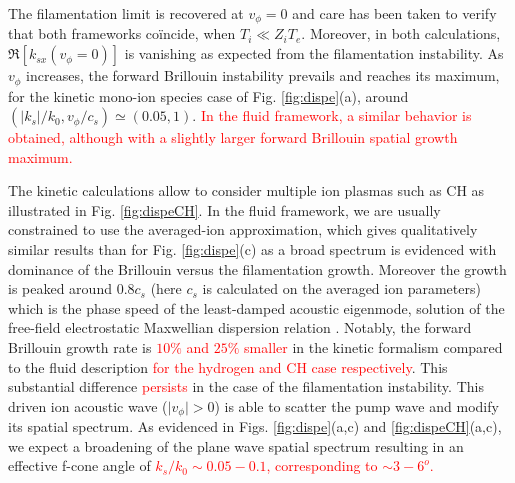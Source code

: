 \documentclass[
 reprint,
 superscriptaddress,
 amsmath,amssymb,
 aps,
]{revtex4-1}
\def\tc{\textcolor{red}}
\begin{document}
The filamentation limit is recovered at $v_\phi=0$ and care has been taken to verify that both frameworks co\"incide, when $T_i\ll Z_iT_e$. Moreover, in both calculations, $\Re[k_{sx}(v_\phi=0)]$ is vanishing as expected from the filamentation instability. As $v_\phi$ increases, the forward Brillouin instability prevails and reaches its maximum, for the kinetic  mono-ion species case of Fig. \ref{fig:dispe}(a), around $(\vert k_s\vert/k_0, v_\phi/c_s) \simeq(0.05,1)$. 
\tc{
In the fluid framework, a similar behavior is obtained, although with a slightly larger forward Brillouin spatial  growth maximum. }

The kinetic calculations allow to consider multiple ion plasmas such as CH as illustrated in Fig. \ref{fig:dispeCH}. In the fluid framework, we are usually constrained to use the averaged-ion approximation, which gives qualitatively similar results than for Fig. \ref{fig:dispe}(c) as a broad spectrum is evidenced with  dominance of the Brillouin versus the filamentation growth. 
Moreover the growth is peaked around $0.8c_s$ (here $c_s$ is calculated on the averaged ion parameters) which is the phase speed of the least-damped acoustic eigenmode, solution of the free-field electrostatic Maxwellian dispersion relation \cite[]{POF_Fried_71,POP_Williams_95}.
Notably, the forward Brillouin growth rate is \tc{ $10\%$ and $25\%$ smaller} in the kinetic formalism compared to the fluid description \tc{for the hydrogen and CH case respectively}. This substantial difference \tc{persists} in the case of the filamentation instability.
This driven ion acoustic wave ($\vert v_\phi\vert >0$) is able to  scatter the pump wave and modify its spatial spectrum. As evidenced in Figs. \ref{fig:dispe}(a,c) and \ref{fig:dispeCH}(a,c), we expect a broadening of the plane wave spatial spectrum  resulting in an effective  f-cone   angle  of \tc{$k_s/k_0\sim 0.05-0.1$, corresponding to $\sim 3-6^o$.   }
\end{document}

